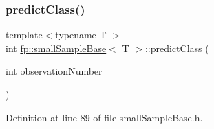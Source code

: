 \subsubsection{\texorpdfstring{predict\+Class()}{predictClass()}}
{\footnotesize\ttfamily template$<$typename T $>$ \\
int \hyperlink{classfp_1_1smallSampleBase}{fp\+::small\+Sample\+Base}$<$ T $>$\+::predict\+Class (\begin{DoxyParamCaption}\item[{int}]{observation\+Number }\end{DoxyParamCaption})\hspace{0.3cm}{\ttfamily [inline]}}



Definition at line 89 of file small\+Sample\+Base.\+h.


